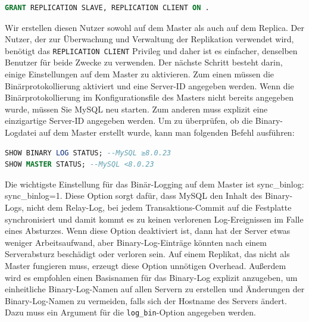 \vspace{-5pt}
\begin{lstlisting}[language=SQL,caption=Nutzererstellung und Rechtevergabe,label={lst:replication-privileges}]
GRANT REPLICATION SLAVE, REPLICATION CLIENT ON .
\end{lstlisting}
\vspace{-5pt}

Wir erstellen diesen Nutzer sowohl auf dem Master als auch auf dem Replica.
Der Nutzer, der zur Überwachung und Verwaltung der Replikation verwendet wird, benötigt das \texttt{REPLICATION CLIENT} Privileg und daher ist es einfacher, denselben Benutzer für beide Zwecke zu verwenden.
Der nächste Schritt besteht darin, einige Einstellungen auf dem Master zu aktivieren.
Zum einen müssen die Binärprotokollierung aktiviert und eine Server-ID angegeben werden.
Wenn die Binärprotokollierung im Konfigurationsfile des Masters nicht bereits angegeben wurde, müssen Sie MySQL neu starten.
Zum anderen muss explizit eine einzigartige Server-ID angegeben werden.
Um zu überprüfen, ob die Binary-Logdatei auf dem Master erstellt wurde, kann man folgenden Befehl ausführen:

\vspace{-5pt}
\begin{lstlisting}[language=SQL,caption=Anzeige der Konfiguration,label={lst:replication-master-config}]
SHOW BINARY LOG STATUS; --MySQL ≥8.0.23
SHOW MASTER STATUS; --MySQL <8.0.23
\end{lstlisting}
\vspace{-5pt}

Die wichtigste Einstellung für das Binär-Logging auf dem Master ist sync\_binlog: sync\_binlog=1.
Diese Option sorgt dafür, dass MySQL den Inhalt des Binary-Logs, nicht dem Relay-Log, bei jedem Transaktions-Commit auf die Festplatte synchronisiert und damit kommt es zu keinen verlorenen Log-Ereignissen im Falle eines Absturzes.
Wenn diese Option deaktiviert ist, dann hat der Server etwas weniger Arbeitsaufwand, aber Binary-Log-Einträge könnten nach einem Serverabsturz beschädigt oder verloren sein.
Auf einem Replikat, das nicht als Master fungieren muss, erzeugt diese Option unnötigen Overhead.
Außerdem wird es empfohlen einen Basisnamen für das Binary-Log explizit anzugeben, um einheitliche Binary-Log-Namen auf allen Servern zu erstellen und Änderungen der Binary-Log-Namen zu vermeiden, falls sich der Hostname des Servers ändert.
Dazu muss ein Argument für die \texttt{log\_bin}-Option angegeben werden.

